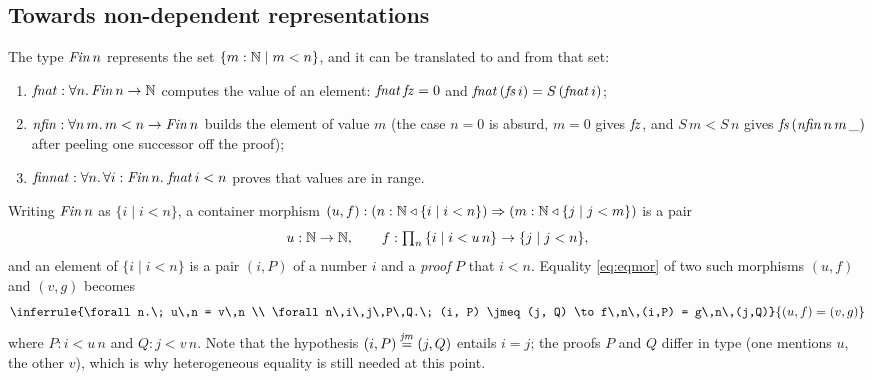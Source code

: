 \documentclass{fundam}
\begin{document}
\subsection{Towards non-dependent representations}\label{sec:nondep}

The type $\mathit{Fin}\,n$ represents the set $\{ m : \mathbb{N} \mid m < n \}$, and it can be translated
to and from that set:
\begin{enumerate}[leftmargin=2em]
\item $\mathit{fnat} : \forall n.\, \mathit{Fin}\,n \to \mathbb{N}$ computes the value of an element:
  $\mathit{fnat}\,\mathit{fz} = 0$ and $\mathit{fnat}\,(\mathit{fs}\,i) = S\,(\mathit{fnat}\,i)$;
\item $\mathit{nfin} : \forall n\,m.\, m < n \to \mathit{Fin}\,n$ builds the element of value $m$
  (the case $n = 0$ is absurd, $m = 0$ gives $\mathit{fz}$, and $S\,m < S\,n$ gives
  $\mathit{fs}\,(\mathit{nfin}\,n\,m\,\_)$ after peeling one successor off the proof);
\item $\mathit{finnat} : \forall n.\, \forall i : \mathit{Fin}\,n.\; \mathit{fnat}\,i < n$ proves that
  values are in range.
\end{enumerate}

\begin{observation}\label{obs:one}
  Writing $\mathit{Fin}\,n$ as $\{i \mid i < n\}$, a container morphism
  $(u, f) : (n : \mathbb{N} \triangleleft \{i \mid i < n\}) \Rightarrow (m : \mathbb{N} \triangleleft \{j \mid j < m\})$
  is a pair
  \[
    u : \mathbb{N} \to \mathbb{N}, \qquad f : \textstyle\prod_n\, \{i \mid i < u\,n\} \to \{j \mid j < n\},
  \]
  and an element of $\{i \mid i < n\}$ is a pair $(i, P)$ of a number $i$ and a
  \emph{proof} $P$ that $i < n$.  Equality \eqref{eq:eqmor} of two such morphisms
  $(u,f)$ and $(v,g)$ becomes
  \begin{equation}\label{eq:eqpairs}
    \inferrule{\forall n.\; u\,n = v\,n \\
               \forall n\,i\,j\,P\,Q.\; (i, P) \jmeq (j, Q) \to f\,n\,(i,P) = g\,n\,(j,Q)}
              {(u,f) = (v,g)}
  \end{equation}
  where $P : i < u\,n$ and $Q : j < v\,n$.  Note that the hypothesis
  $(i, P) \mathrel{\stackrel{\mathit{jm}}{=}} (j, Q)$ entails $i = j$; the proofs $P$ and $Q$ differ in type (one
  mentions $u$, the other $v$), which is why heterogeneous equality is still needed at
  this point.
\end{observation}
\end{document}
